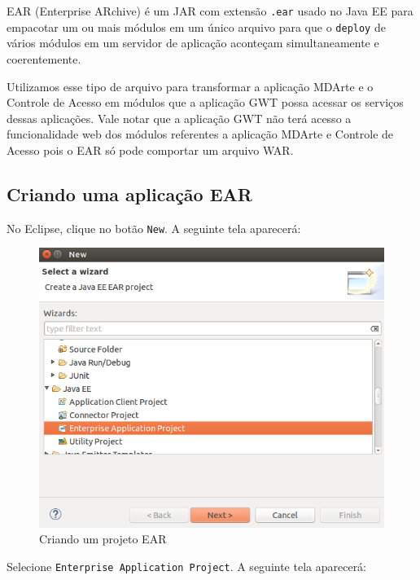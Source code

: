 EAR (Enterprise ARchive) é um JAR com extensão \texttt{.ear} usado no Java EE para empacotar um ou mais módulos em um único
arquivo para que o \texttt{deploy} de vários módulos em um servidor de aplicação aconteçam simultaneamente e coerentemente.

Utilizamos esse tipo de arquivo para transformar a aplicação MDArte e o Controle de Acesso em módulos que a aplicação GWT possa
acessar os serviços dessas aplicações. Vale notar que a aplicação GWT não terá acesso a funcionalidade web dos módulos referentes
a aplicação MDArte e Controle de Acesso pois o EAR só pode comportar um arquivo WAR.

\subsection{Criando uma aplicação EAR}

No Eclipse, clique no botão \texttt{New}. A seguinte tela aparecerá:

\begin{figure}[H]
	\centering
	\includegraphics[scale=0.5]{files/imgs/gwt-04.png}
	\caption{Criando um projeto EAR}
	\label{gwt04}
\end{figure}

Selecione \texttt{Enterprise Application Project}. A seguinte tela aparecerá:

